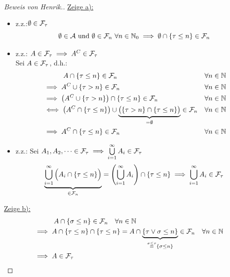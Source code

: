 \documentclass[12pt,a4paper]{article}
\begin{document}
\begin{proof}[Beweis von Henrik.]
\underline{Zeige a):}\
\begin{itemize} 
	\item z.z.:$\emptyset \in \mathcal{F}_\tau$
	\begin{equation*}
		\emptyset \in \mathcal{A} \text{ und } \emptyset \in \mathcal{F}_n\  \forall n \in \mathbb{N}_0 \implies \emptyset \cap \{\tau \leq n\} \in \mathcal{F}_n
	\end{equation*}
	\item z.z.: $A \in \mathcal{F}_\tau \implies A^C \in \mathcal{F}_\tau$\\
	Sei $A \in \mathcal{F}_\tau$, d.h.:
	\begin{align*}
		&{}\qquad \quad  A \cap \{\tau \leq n\} \in \mathcal{F}_n
		 &\forall n \in \mathbb{N}\\
		&\implies	A^C \cup \{\tau > n\} \in \mathcal{F}_n 
		 &\forall n \in \mathbb{N}\\
		&\implies 	\left(	A^C \cup \{\tau > n\}\right) \cap \{\tau \leq n\} \in \mathcal{F}_n
		 & \forall n \in \mathbb{N}\\
		& \iff \left(	A^C \cap \{\tau \leq n\}\right) \cup \underbrace{\big ( \{\tau > n\}\cap\{\tau \leq n\} \big )}_{= \emptyset} \in \mathcal{F}_n 
		 & \forall n \in \mathbb{N}\\
		&\implies A^C \cap \{\tau \leq n\} \in \mathcal{F}_n
		 & \forall n \in \mathbb{N}
	\end{align*}
	
	\item z.z.: Sei $A_1, A_2,\dots \in \mathcal{F}_\tau \implies \bigcup\limits_{i=1}^{\infty} A_i  \in \mathcal{F}_\tau$
	\begin{equation*}
		\underbrace{\bigcup\limits_{i=1}^{\infty} \Big (A_i \cap \{\tau \leq n\} \Big )}_{\in \mathcal{F}_n} = \left( \bigcup\limits_{i=1}^{\infty} A_i \right)\cap \{\tau \leq n\} \implies  \bigcup\limits_{i=1}^{\infty} A_i \in \mathcal{F}_\tau
	\end{equation*}
	
\end{itemize}

\underline{Zeige b):}
\begin{align*}
	&{}\qquad \quad  A \cap \{\sigma \leq n\}  \in \mathcal{F}_n \quad \forall n \in \mathbb{N}\\
	&\implies A \cap \{\tau \leq n\} \cap \{\tau \leq n\} = A \cap \underbrace{ \{\tau \vee \sigma \leq n\}}_{ \overset{\sigma \leq \tau}{=} \{\sigma \leq n\} } \in \mathcal{F}_n \quad \forall n \in \mathbb{N}\\
	&\implies A \in \mathcal{F}_\tau \\
\end{align*}


\end{proof}
\end{document}
